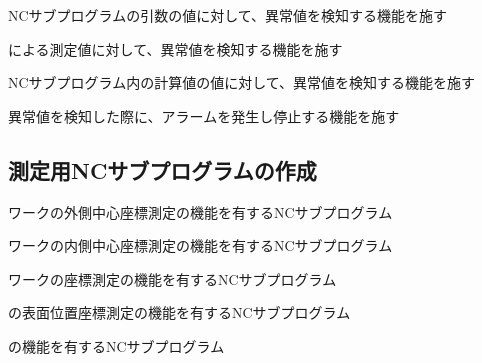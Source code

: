 \begin{enumerate}[label*={\sarrow[red]}]
\item NCサブプログラムの引数の値に対して、異常値を検知する機能を施す
\item \TouchSensorProbe による測定値に対して、異常値を検知する機能を施す
\item NCサブプログラム内の計算値の値に対して、異常値を検知する機能を施す
\item 異常値を検知した際に、アラームを発生し停止する機能を施す
\end{enumerate}



\clearpage


\subsection{測定用NCサブプログラムの作成}
\begin{enumerate}[label={\sarrow[red]}]
\item ワークの外側中心座標測定の機能を有するNCサブプログラム
\item ワークの内側中心座標測定の機能を有するNCサブプログラム
\item ワークの\OutcutCenter 座標測定の機能を有するNCサブプログラム
\item \Dimple の表面位置座標測定の機能を有するNCサブプログラム
\item \CenterlineEndFaceDifMeasurement の機能を有するNCサブプログラム
\end{enumerate}


